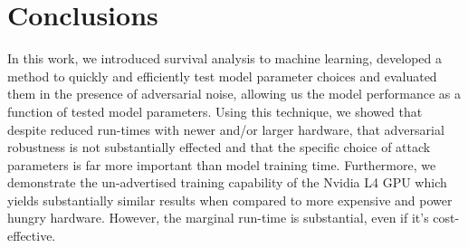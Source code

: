 \documentclass[conference]{IEEEtran}
\begin{document}
\section{Conclusions}
\label{conclusion}
In this work, we introduced survival analysis to machine learning, developed a method to quickly and efficiently test model parameter choices and evaluated them in the presence of adversarial noise, allowing us the model performance as a function of tested model parameters. Using this technique, we showed that despite reduced run-times with newer and/or larger hardware, that adversarial robustness is not substantially effected and that the specific choice of attack parameters is far more important than model training time. Furthermore, we demonstrate the un-advertised training capability of the Nvidia L4 GPU which yields substantially similar results when compared to more expensive and power hungry hardware. However, the marginal run-time is substantial, even if it's cost-effective.

%
\IEEEpeerreviewmaketitle


\clearpage


\end{document}
